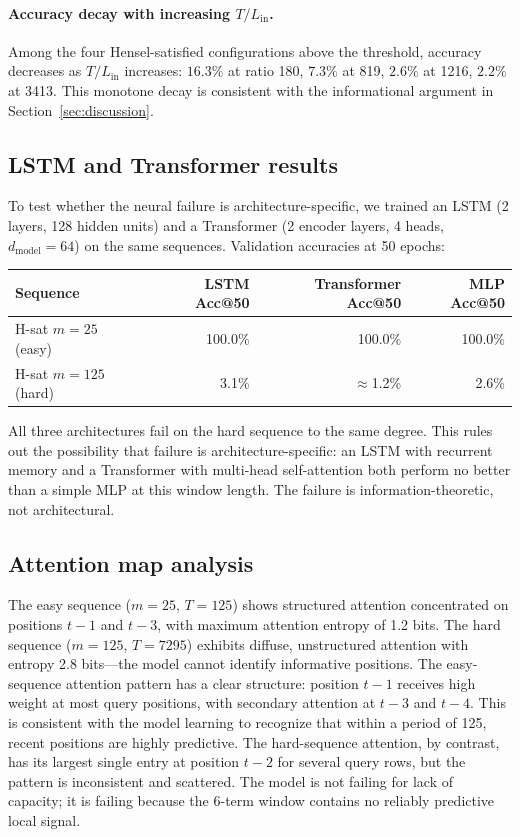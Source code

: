 \documentclass[11pt]{article}
\theoremstyle{plain}
\theoremstyle{definition}
\begin{document}
\paragraph{Accuracy decay with increasing $T/L_{\mathrm{in}}$.} Among the four Hensel-satisfied configurations above the threshold, accuracy decreases as $T/L_{\mathrm{in}}$ increases: $16.3\%$ at ratio 180, $7.3\%$ at 819, $2.6\%$ at 1216, $2.2\%$ at 3413. This monotone decay is consistent with the informational argument in Section~\ref{sec:discussion}.

\subsection{LSTM and Transformer results}
\label{sec:results:lstm}

To test whether the neural failure is architecture-specific, we trained an LSTM (2 layers, 128 hidden units) and a Transformer (2 encoder layers, 4 heads, $d_{\mathrm{model}}=64$) on the same sequences. Validation accuracies at 50 epochs:

\begin{center}
\begin{tabular}{lrrr}
\toprule
Sequence & LSTM Acc@50 & Transformer Acc@50 & MLP Acc@50\\
\midrule
H-sat $m=25$ (easy) & 100.0\% & 100.0\% & 100.0\%\\
H-sat $m=125$ (hard) & 3.1\% & $\approx$1.2\% & 2.6\%\\
\bottomrule
\end{tabular}
\end{center}

All three architectures fail on the hard sequence to the same degree. This rules out the possibility that failure is architecture-specific: an LSTM with recurrent memory and a Transformer with multi-head self-attention both perform no better than a simple MLP at this window length. The failure is information-theoretic, not architectural.

\subsection{Attention map analysis}
\label{sec:results:attn}

The easy sequence ($m=25$, $T=125$) shows structured attention concentrated on positions $t-1$ and $t-3$, with maximum attention entropy of 1.2 bits. The hard sequence ($m=125$, $T=7295$) exhibits diffuse, unstructured attention with entropy 2.8 bits---the model cannot identify informative positions. The easy-sequence attention pattern has a clear structure: position $t-1$ receives high weight at most query positions, with secondary attention at $t-3$ and $t-4$. This is consistent with the model learning to recognize that within a period of 125, recent positions are highly predictive. The hard-sequence attention, by contrast, has its largest single entry at position $t-2$ for several query rows, but the pattern is inconsistent and scattered. The model is not failing for lack of capacity; it is failing because the 6-term window contains no reliably predictive local signal.
\end{document}
